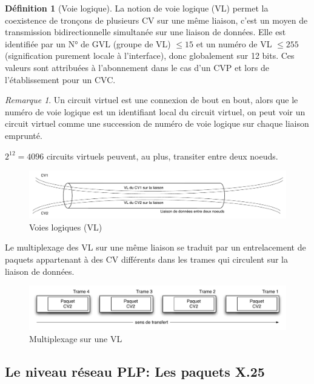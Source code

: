 \documentclass[11pt,english,french]{scrreprt}
\theoremstyle{remark}
\newtheorem*{rem*}{Remarque}
\theoremstyle{definition}
\newtheorem*{def*}{Définition}
\begin{document}
\begin{def*}[Voie logique]
	La notion de voie logique (VL) permet la coexistence de tronçons de plusieurs CV sur une même liaison, c'est un moyen de transmission bidirectionnelle simultanée sur une liaison de données. Elle est identifiée par un N° de GVL (groupe de VL) $\le 15$ et un numéro de VL $\le 255$ 
	(signification purement locale à l'interface), donc globalement sur 12 bits. Ces valeurs sont attribuées à l'abonnement dans le cas d'un CVP et lors de l'établissement pour un CVC.
\end{def*}

\begin{rem*}
	Un circuit virtuel est une connexion de bout en bout, alors que le numéro de voie logique est un identifiant local du circuit virtuel, on peut voir un circuit virtuel comme une succession de numéro de voie logique sur chaque liaison emprunté.
	
	$2^{12} = 4096$ circuits virtuels peuvent, au plus, transiter entre deux noeuds.
\end{rem*}

\begin{figure}[h!]
	\center
	\includegraphics[scale=.7]{graphes/VL}
	\caption{Voies logiques (VL)}
\end{figure}

Le multiplexage des VL sur une même liaison se traduit par un entrelacement de paquets appartenant à des CV différents dans les trames qui circulent sur la liaison de données.

\begin{figure}[h!]
	\center
	\includegraphics[scale=.7]{graphes/multiplexage-paquets}
	\caption{Multiplexage sur une VL}
\end{figure}

\subsection{Le niveau réseau PLP: Les paquets X.25}
\end{document}
